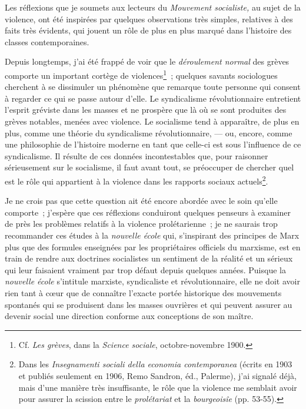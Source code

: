\documentclass[french,twoside]{book} %
\begin{document}
\noindent Les réflexions que je soumets aux lecteurs du \emph{Mouvement socialiste,} au sujet de la violence, ont été inspirées par quelques observations très simples, relatives à des faits très évidents, qui jouent un rôle de plus en plus marqué dans l’histoire des classes contemporaines.\par
Depuis longtemps, j’ai été frappé de voir que le \emph{déroulement normal} des grèves comporte un important cortège de violences\footnote{ \noindent Cf. \emph{Les grèves}, dans la \emph{Science sociale}, octobre-novembre 1900.
 } ; quelques savants sociologues cherchent à se dissimuler un phénomène que remarque toute personne qui consent à regarder ce qui se passe autour d’elle. Le syndicalisme révolutionnaire entretient l’esprit gréviste dans les masses et ne prospère que là où se sont produites des grèves notables, menées avec violence. Le socialisme tend à apparaître, de plus  en plus, comme une théorie du syndicalisme révolutionnaire, — ou, encore, comme une philosophie de l’histoire moderne en tant que celle-ci est sous l’influence de ce syndicalisme. Il résulte de ces données incontestables que, pour raisonner sérieusement sur le socialisme, il faut avant tout, se préoccuper de chercher quel est le rôle qui appartient à la violence dans les rapports sociaux actuels\footnote{ \noindent Dans les \emph{Insegnamenti sociali della economia contemporanea} (écrits en 1903 et publiés seulement en 1906, Remo Sandron, éd., Palerme), j’ai signalé déjà, mais d’une manière très insuffisante, le rôle que la violence me semblait avoir pour assurer la scission entre le \emph{prolétariat} et la \emph{bourgeoisîe} (pp. 53-55).
 }.\par
Je ne crois pas que cette question ait été encore abordée avec le soin qu’elle comporte ; j’espère que ces réflexions conduiront quelques penseurs à examiner de près les problèmes relatifs à la violence prolétarienne ; je ne saurais trop recommander ces études à la \emph{nouvelle école} qui, s’inspirant des principes de Marx plus que des formules enseignées par les propriétaires officiels du marxisme, est en train de rendre aux doctrines socialistes un sentiment de la réalité et un sérieux qui leur faisaient vraiment par trop défaut depuis quelques années. Puisque la \emph{nouvelle école} s’intitule marxiste, syndicaliste et révolutionnaire, elle ne doit avoir rien tant à cœur que de connaître l’exacte portée historique des mouvements spontanés qui se produisent dans les masses ouvrières et qui peuvent assurer au devenir social une direction conforme aux conceptions de son maître.\par
\end{document}
